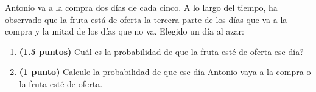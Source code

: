 
Antonio va a la compra dos días de cada cinco. A lo largo del tiempo, ha observado que la fruta está de oferta la tercera parte de los días que va a la compra y la mitad de los días que no va. Elegido un día al azar:
\begin{enumerate}[label=\alph*)]
\item \textbf{(1.5 puntos)} \textquestiondown{}Cuál es la probabilidad de que la fruta esté de oferta ese día?
\item \textbf{(1 punto)} Calcule la probabilidad de que ese día Antonio vaya a la compra o la fruta esté de oferta.
\end{enumerate}
